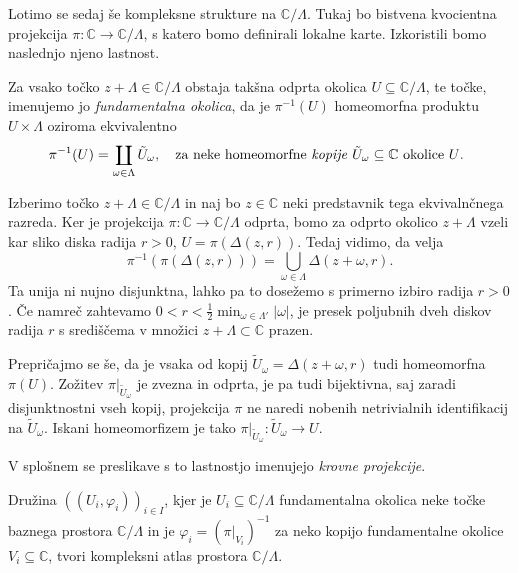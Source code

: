\documentclass[mat1]{fmfdelo}
\numberwithin{equation}{section}
\newcommand{\C}{\mathbb C}
\newcommand{\om}{\omega}
\newcommand{\inv}{^{-1}}
\newcommand{\torus}{\C/\Lambda}
\newcommand{\abs}[1]{\left\lvert #1 \right\rvert}
\newcommand{\disk}[2]{\Delta(#1, #2)}
\theoremstyle{definition}
\begin{document}
Lotimo se sedaj še kompleksne strukture na $\torus$. Tukaj bo bistvena kvocientna projekcija $\pi: \C \to \torus$, s katero bomo definirali lokalne karte. Izkoristili bomo naslednjo njeno lastnost. 

\begin{lema}
    \label{pi je krovna}
    Za vsako točko $z + \Lambda \in \torus$ obstaja takšna odprta okolica $U \subseteq \torus$, te točke, imenujemo jo \emph{fundamentalna okolica}, da je $\pi\inv(U)$ homeomorfna produktu $U \times \Lambda$ oziroma ekvivalentno 
    \[
        \pi\inv(U) = \coprod_{\om \in \Lambda} \tilde{U}_\om, \quad \text{za neke homeomorfne \emph{kopije} $\tilde{U}_\om \subseteq \C$ okolice $U$. } 
    \]
\end{lema}

\begin{dokaz}
    Izberimo točko $z + \Lambda \in \torus$ in naj bo $z \in \C$ neki predstavnik tega ekvivalnčnega razreda. Ker je projekcija $\pi: \C \to \torus$ odprta, bomo za odprto okolico $z + \Lambda$ vzeli kar sliko diska radija $r>0$, $U = \pi(\disk{z}{r})$. Tedaj vidimo, da velja 
    \[
        \pi\inv(\pi(\disk{z}{r})) = \bigcup_{\om \in \Lambda} \disk{z + \om}{r}.
    \] 
    Ta unija ni nujno disjunktna, lahko pa to dosežemo s primerno izbiro radija $r>0$. Če namreč zahtevamo $0 < r < \frac12 \min_{\om \in \Lambda'} \abs{\om}$, je presek poljubnih dveh diskov radija $r$ s središčema v množici $z + \Lambda \subset \C$ prazen. 

    Prepričajmo se še, da je vsaka od kopij $\tilde{U}_\om = \disk{z + \om}{r}$ tudi homeomorfna $\pi(U)$. Zožitev $\pi|_{\tilde{U}_\om}$ je zvezna in odprta, je pa tudi bijektivna, saj zaradi disjunktnostni vseh kopij, projekcija $\pi$ ne naredi nobenih netrivialnih identifikacij na $\tilde{U}_\om$. Iskani homeomorfizem je tako $\pi|_{\tilde{U}_\om} : \tilde{U}_\om \to U$.
\end{dokaz}

\begin{opomba}
    V splošnem se preslikave s to lastnostjo imenujejo \emph{krovne projekcije}.
\end{opomba}

\begin{trditev}
    Družina $((U_i, \varphi_i))_{i \in I}$, kjer je $U_i \subseteq \torus$ fundamentalna okolica neke točke baznega prostora $\torus$ in je $\varphi_i = (\pi|_{V_i})\inv$ za neko kopijo fundamentalne okolice $V_i \subseteq \C$, tvori kompleksni atlas prostora $\torus$.  
\end{trditev}
\end{document}
